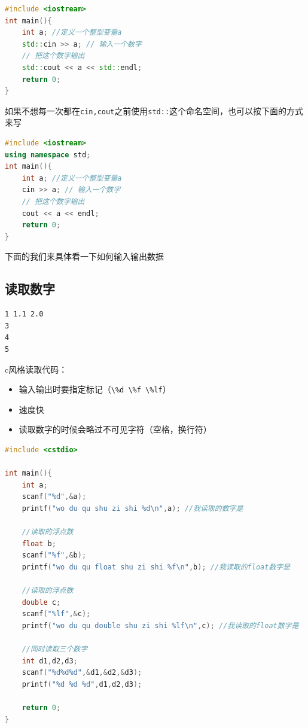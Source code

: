 \documentclass[
  paper=a4,
  ,captions=tableheading
]{scrbook}
\newcommand{\passthrough}[1]{#1}
\providecommand{\tightlist}{%
  \setlength{\itemsep}{0pt}\setlength{\parskip}{0pt}}
\begin{document}
\begin{lstlisting}[language={C++}]
#include <iostream>
int main(){
    int a; //定义一个整型变量a
    std::cin >> a; // 输入一个数字
    // 把这个数字输出
    std::cout << a << std::endl;
    return 0;
}
\end{lstlisting}

如果不想每一次都在\passthrough{\lstinline!cin,cout!}之前使用\passthrough{\lstinline!std::!}这个命名空间，也可以按下面的方式来写

\begin{lstlisting}[language={C++}]
#include <iostream>
using namespace std;
int main(){
    int a; //定义一个整型变量a
    cin >> a; // 输入一个数字
    // 把这个数字输出
    cout << a << endl;
    return 0;
}
\end{lstlisting}

下面的我们来具体看一下如何输入输出数据

\hypertarget{ux8bfbux53d6ux6570ux5b57}{%
\subsection{读取数字}\label{ux8bfbux53d6ux6570ux5b57}}

\begin{lstlisting}
1 1.1 2.0
3
4
5
\end{lstlisting}

c风格读取代码：

\begin{itemize}
\tightlist
\item
  输入输出时要指定标记（\passthrough{\lstinline!\%d \%f \%lf!}）
\item
  速度快
\item
  读取数字的时候会略过不可见字符（空格，换行符）
\end{itemize}

\begin{lstlisting}[language={C++}]
#include <cstdio>

int main(){
    int a;
    scanf("%d",&a);
    printf("wo du qu shu zi shi %d\n",a); //我读取的数字是

    //读取的浮点数
    float b;
    scanf("%f",&b);
    printf("wo du qu float shu zi shi %f\n",b); //我读取的float数字是

    //读取的浮点数
    double c;
    scanf("%lf",&c);
    printf("wo du qu double shu zi shi %lf\n",c); //我读取的float数字是

    //同时读取三个数字
    int d1,d2,d3;
    scanf("%d%d%d",&d1,&d2,&d3);
    printf("%d %d %d",d1,d2,d3);

    return 0;
}
\end{lstlisting}
\end{document}
